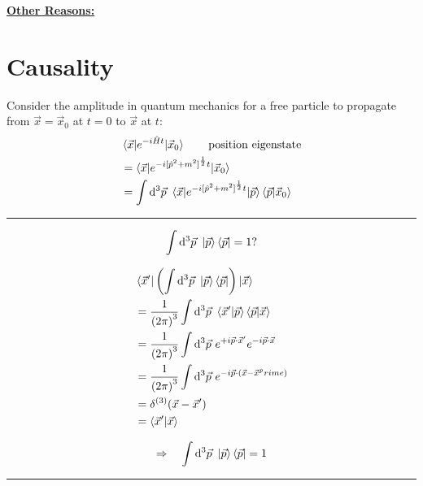 \documentclass{article}
\begin{document}
\vspace{12pt}
\noindent \underline{\textbf{Other Reasons:}}

\section{Causality}

Consider the amplitude in quantum mechanics for a free particle to propagate from $ \vec{x} = \vec{x}_0 $ at $ t = 0 $ to $ \vec{x} $ at $t$:
\begin{align*}
& \braket{ \vec{x} | e^{ -i \hat{H} t } | \vec{x}_0 } \qquad \mathrm{position~eigenstate} \\
&= \braket{ \vec{x} | e^{ -i {[ \hat{p}^2 + m^2 ]}^\frac{1}{2} t } | \vec{x}_0 } \\
&= \int \mathrm{d}^3 \vec{p} ~ \braket{ \vec{x} | e^{ -i {[ \hat{p}^2 + m^2 ]}^\frac{1}{2} t } | \vec{p} } \braket{ \vec{p} | \vec{x}_0 }
\end{align*}

\noindent\rule{\textwidth}{.5pt}


\begin{equation*}
\int \mathrm{d}^3 \vec{p} ~ \ket{\vec{p}} \bra{\vec{p}} = 1 ?
\end{equation*}

\begin{align*}
& \braket{ \vec{x}^\prime | \left( \int \mathrm{d}^3 \vec{p} ~ \ket{\vec{p}} \bra{\vec{p}} \right) | \vec{x} } \\
&= \frac{1}{{(2 \pi)}^3} \int \mathrm{d}^3 \vec{p} ~ \braket{ \vec{x}^\prime | \vec{p} } \braket{ \vec{p} | \vec{x} } \\
&= \frac{1}{{(2 \pi)}^3} \int \mathrm{d}^3 \vec{p} ~ e^{ +i \vec{p} \cdot \vec{x}^\prime } e^{ -i \vec{p} \cdot \vec{x} } \\
&= \frac{1}{{(2 \pi)}^3} \int \mathrm{d}^3 \vec{p} ~ e^{ -i \vec{p} \cdot ( \vec{x} - \vec{x}^prime ) } \\
&= \delta^{(3)} ( \vec{x} - \vec{x}^\prime ) \\
&= \braket{ \vec{x}^\prime | \vec{x} }
\end{align*}

\begin{equation*}
\Rightarrow \quad \int \mathrm{d}^3 \vec{p} ~ \ket{\vec{p}} \bra{\vec{p}} = 1
\end{equation*}

\noindent\rule{\textwidth}{.5pt}
\end{document}
